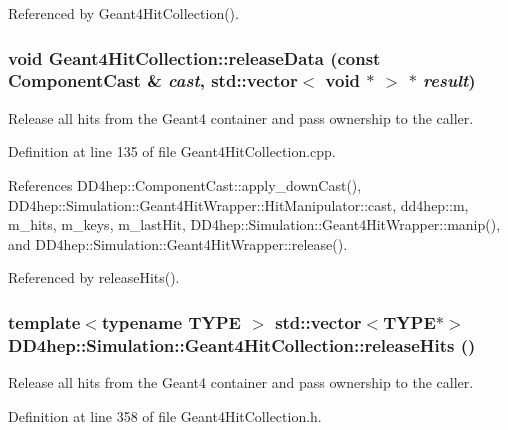 Referenced by Geant4HitCollection().\hypertarget{class_d_d4hep_1_1_simulation_1_1_geant4_hit_collection_a0bd80f5c59a487fef77a04020c9c24a2}{
\subsubsection[{releaseData}]{\setlength{\rightskip}{0pt plus 5cm}void Geant4HitCollection::releaseData (const {\bf ComponentCast} \& {\em cast}, \/  std::vector$<$ void $\ast$ $>$ $\ast$ {\em result})}}
\label{class_d_d4hep_1_1_simulation_1_1_geant4_hit_collection_a0bd80f5c59a487fef77a04020c9c24a2}


Release all hits from the Geant4 container and pass ownership to the caller. 

Definition at line 135 of file Geant4HitCollection.cpp.

References DD4hep::ComponentCast::apply\_\-downCast(), DD4hep::Simulation::Geant4HitWrapper::HitManipulator::cast, dd4hep::m, m\_\-hits, m\_\-keys, m\_\-lastHit, DD4hep::Simulation::Geant4HitWrapper::manip(), and DD4hep::Simulation::Geant4HitWrapper::release().

Referenced by releaseHits().\hypertarget{class_d_d4hep_1_1_simulation_1_1_geant4_hit_collection_a956b41eb42d71e0270e266d4776ee778}{
\subsubsection[{releaseHits}]{\setlength{\rightskip}{0pt plus 5cm}template$<$typename TYPE $>$ std::vector$<$TYPE$\ast$$>$ DD4hep::Simulation::Geant4HitCollection::releaseHits ()}}
\label{class_d_d4hep_1_1_simulation_1_1_geant4_hit_collection_a956b41eb42d71e0270e266d4776ee778}


Release all hits from the Geant4 container and pass ownership to the caller. 

Definition at line 358 of file Geant4HitCollection.h.

